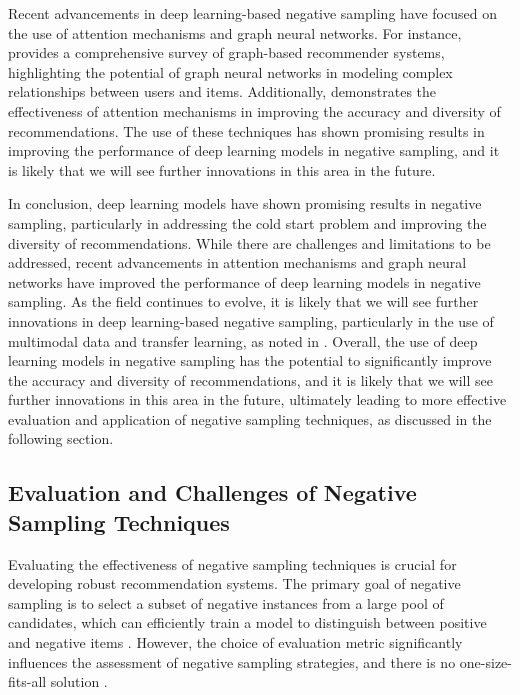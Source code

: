 \documentclass[11pt,a4paper]{article}
\begin{document}
Recent advancements in deep learning-based negative sampling have focused on the use of attention mechanisms and graph neural networks. For instance, \cite{doi:10.1109/globalsip.2018.8646359} provides a comprehensive survey of graph-based recommender systems, highlighting the potential of graph neural networks in modeling complex relationships between users and items. Additionally, \cite{doi:10.1145/3580305.3599869} demonstrates the effectiveness of attention mechanisms in improving the accuracy and diversity of recommendations. The use of these techniques has shown promising results in improving the performance of deep learning models in negative sampling, and it is likely that we will see further innovations in this area in the future.

In conclusion, deep learning models have shown promising results in negative sampling, particularly in addressing the cold start problem and improving the diversity of recommendations. While there are challenges and limitations to be addressed, recent advancements in attention mechanisms and graph neural networks have improved the performance of deep learning models in negative sampling. As the field continues to evolve, it is likely that we will see further innovations in deep learning-based negative sampling, particularly in the use of multimodal data and transfer learning, as noted in \cite{doi:10.28945/5696}. Overall, the use of deep learning models in negative sampling has the potential to significantly improve the accuracy and diversity of recommendations, and it is likely that we will see further innovations in this area in the future, ultimately leading to more effective evaluation and application of negative sampling techniques, as discussed in the following section.


\subsection{Evaluation and Challenges of Negative Sampling Techniques}


Evaluating the effectiveness of negative sampling techniques is crucial for developing robust recommendation systems. The primary goal of negative sampling is to select a subset of negative instances from a large pool of candidates, which can efficiently train a model to distinguish between positive and negative items \cite{doi:10.1145/3394486.3403226}. However, the choice of evaluation metric significantly influences the assessment of negative sampling strategies, and there is no one-size-fits-all solution \cite{doi:10.1145/3340531.3412095}.
\end{document}
